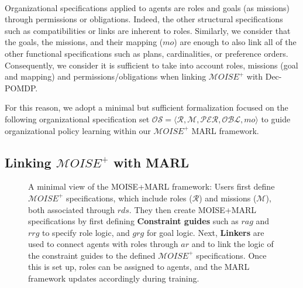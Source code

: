 \documentclass[pdflatex,sn-mathphys-num]{sn-jnl}%
\theoremstyle{thmstyleone}%
\theoremstyle{thmstyletwo}%
\theoremstyle{thmstylethree}%
\begin{document}
\

\noindent Organizational specifications applied to agents are roles and goals (as missions) through permissions or obligations. Indeed, the other structural specifications such as compatibilities or links are inherent to roles. Similarly, we consider that the goals, the missions, and their mapping ($mo$) are enough to also link all of the other functional specifications such as plans, cardinalities, or preference orders.
Consequently, we consider it is sufficient to take into account roles, missions (goal and mapping) and permissions/obligations when linking $\mathcal{M}OISE^+$ with Dec-POMDP. 

For this reason, we adopt a minimal but sufficient formalization focused on the following organizational specification set $\mathcal{OS} = \langle \mathcal{R}, \mathcal{M}, \mathcal{PER}, \mathcal{OBL}, mo \rangle$ to guide organizational policy learning within our $\mathcal{M}OISE^+$ MARL framework.


\subsection{Linking $\mathcal{M}OISE^+$ with MARL}

\begin{figure}[h!]
    \centering
    
    \caption{A minimal view of the MOISE+MARL framework:
        Users first define $\mathcal{M}OISE^+$ specifications, which include roles ($\mathcal{R}$) and missions ($\mathcal{M}$), both associated through $rds$. They then create MOISE+MARL specifications by first defining \textbf{Constraint guides} such as $rag$ and $rrg$ to specify role logic, and $grg$ for goal logic. 
        Next, \textbf{Linkers} are used to connect agents with roles through $ar$ and to link the logic of the constraint guides to the defined $\mathcal{M}OISE^+$ specifications. Once this is set up, roles can be assigned to agents, and the MARL framework updates accordingly during training.
    }
    \label{fig:mm_synthesis}
\end{figure}

\
\end{document}
